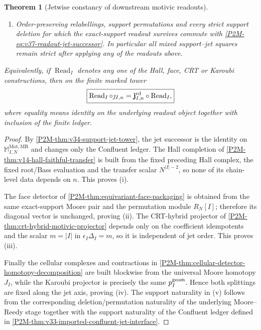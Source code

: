 \documentclass[11pt]{article}
\newtheorem{theorem}{Theorem}[section]
\theoremstyle{remark}
\newcommand{\Mot}{\mathrm{Mot}}
\newcommand{\MR}{\mathrm{MR}}
\begin{document}
\begin{theorem}[Jetwise constancy of downstream motivic readouts]
\begin{enumerate}[label=\textup{(\roman*)}]
\item Order-preserving relabellings, support permutations and every strict
support deletion for which the exact-support readout survives commute with
\eqref{P2M-eq:v37-readout-jet-successor}.  In particular all mixed
support--jet squares remain strict after applying any of the readouts above.
\end{enumerate}
Equivalently, if $\operatorname{Read}_I$ denotes any one of the Hall, face,
CRT or Karoubi constructions, then on the finite marked tower
\begin{equation}\label{P2M-eq:v37-readout-interchange}
 \boxed{
 \operatorname{Read}_I\circ\jmath_{I,n}
 =\mathbf j^{\rm rd}_{I,n}\circ\operatorname{Read}_I,}
\end{equation}
where equality means identity on the underlying readout object together with
inclusion of the finite ledger.
\end{theorem}

\begin{proof}
By \cref{P2M-thm:v34-support-jet-tower}, the jet successor is the identity on
$\mathbb M_{I,N}^{\Mot,\MR}$ and changes only the Confluent ledger.  The Hall
completion of \cref{P2M-thm:v14-hall-faithful-transfer} is built from the fixed
preceding Hall complex, the fixed root/Bass evaluation and the transfer scalar
$N^{|I|-2}$, so none of its chain-level data depends on $n$.  This proves
\textup{(i)}.

The face detector of \cref{P2M-thm:equivariant-face-packaging} is obtained from
the same exact-support Moore pair and the permutation module $R_N[I]$;
therefore its diagonal vector is unchanged, proving \textup{(ii)}.  The
CRT-hybrid projector of \cref{P2M-thm:crt-hybrid-motivic-projector} depends only on
the coefficient idempotents and the scalar $m=|I|$ in
$\epsilon_I\Delta_I=m$, so it is independent of jet order.  This proves
\textup{(iii)}.

Finally the cellular complexes and contractions in
\cref{P2M-thm:cellular-detector-homotopy-decomposition} are built blockwise from
the universal Moore homotopy $J_I$, while the Karoubi projector is precisely
the same $p_I^{\rm geom}$.  Hence both splittings are fixed along the jet
axis, proving \textup{(iv)}.  The support naturality in \textup{(v)} follows
from the corresponding deletion/permutation naturality of the underlying
Moore--Reedy stage together with the support naturality of the Confluent
ledger defined in \cref{P2M-thm:v33-imported-confluent-jet-interface}.
\end{proof}
\end{document}
